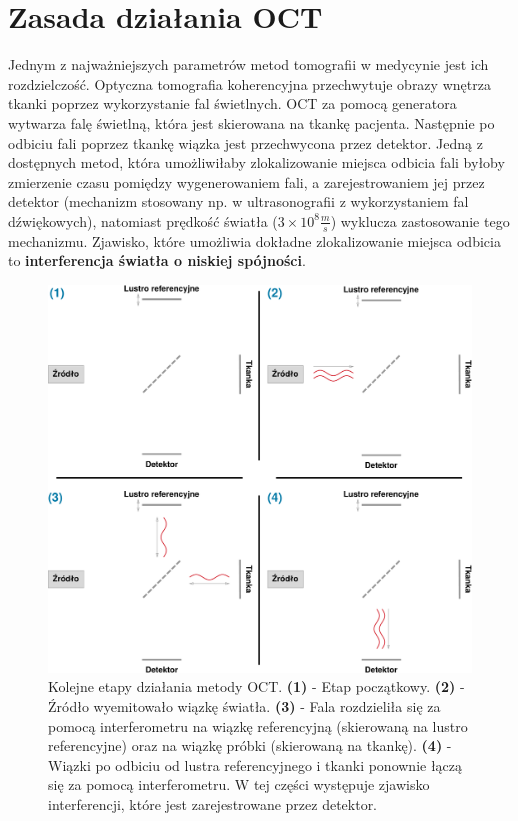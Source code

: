 
\section{Zasada działania OCT}
\label{sec:obrazowanie_oct:metoda_oct}

Jednym z najważniejszych parametrów metod tomografii w medycynie jest ich rozdzielczość. Optyczna tomografia koherencyjna przechwytuje obrazy wnętrza tkanki poprzez wykorzystanie fal świetlnych. OCT za pomocą generatora wytwarza falę świetlną, która jest skierowana na tkankę pacjenta. Następnie po odbiciu fali poprzez tkankę wiązka jest przechwycona przez detektor. Jedną z dostępnych metod, która umożliwiłaby zlokalizowanie miejsca odbicia fali byłoby zmierzenie czasu pomiędzy wygenerowaniem fali, a zarejestrowaniem jej przez detektor (mechanizm stosowany np. w ultrasonografii z wykorzystaniem fal dźwiękowych), natomiast prędkość światła (\(3\times10^8 \frac{m}{s}\)) wyklucza zastosowanie tego mechanizmu. Zjawisko, które umożliwia dokładne zlokalizowanie miejsca odbicia to \textbf{interferencja światła o niskiej spójności}.

\begin{figure}[htb]
	\centering
	\includegraphics[width=\textwidth]{gfx/oct_phases}
	\caption{Kolejne etapy działania metody OCT. \textbf{(1)} - Etap początkowy. \textbf{(2)} - Źródło wyemitowało wiązkę światła. \textbf{(3)} - Fala rozdzieliła się za pomocą interferometru na wiązkę referencyjną (skierowaną na lustro referencyjne) oraz na wiązkę próbki (skierowaną na tkankę). \textbf{(4)} - Wiązki po odbiciu od lustra referencyjnego i tkanki ponownie łączą się za pomocą interferometru. W tej części występuje zjawisko interferencji, które jest zarejestrowane przez detektor.}
	\label{fig:obrazowanie_oct:oct_phases}
\end{figure}

